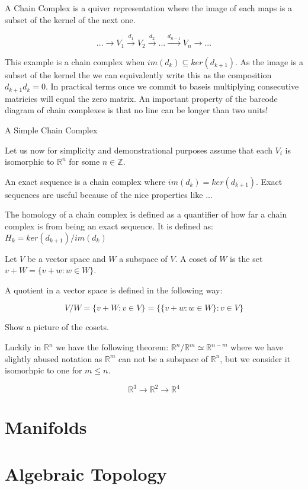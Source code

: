 A Chain Complex is a quiver representation where the image of each maps is a subset of the kernel of the next one.

$$ ... \longrightarrow V_1 \overset{d_1}{\longrightarrow} V_2 \overset{d_2}{\longrightarrow} ... \overset{d_{n-1}}{\longrightarrow} V_n  \longrightarrow ... $$

This example is a chain complex when $im(d_k) \subseteq ker(d_{k+1})$. As the image is a subset of the kernel the we can equivalently write this as the composition $d_{k+1}d_k = 0$. In practical terms once we commit to baseis multiplying consecutive matricies will equal the zero matrix. An important property of the barcode diagram of chain complexes is that no line can be longer than two units!


\begin{ex}  A Simple Chain Complex \end{ex}
Let us now for simplicity and demonstrational purposes assume that each $V_i$ is isomorphic to $\mathbb{R}^n$ for some $n \in \mathbb{Z}$.


An exact sequence is a chain complex where $im(d_k) = ker(d_{k+1})$. Exact sequences are useful because of the nice properties like ...

The homology of a chain complex is defined as a quantifier of how far a chain complex is from being an exact sequence. It is defined as: $ H_k = ker(d_{k+1}) / im(d_k) $

Let $V$ be a vector space and $W$ a subspace of $V$. A coset of $W$ is the set $v + W = \{v + w : w \in W\}$.

A quotient in a vector space is defined in the following way: 

$$ V/W = \{v + W: v \in V\} = \{\{v + w : w \in W\} : v \in V \}$$

Show a picture of the cosets.

Luckily in $\mathbb{R}^n$ we have the following theorem: $\mathbb{R}^n / \mathbb{R}^m \simeq \mathbb{R}^{n - m} $ where we have slightly abused notation as $\mathbb{R}^m$ can not be a subspace of $\mathbb{R}^n$, but we consider it isomorhpic to one for $m \le n$.

$$ \mathbb{R}^3 {\longrightarrow} \mathbb{R}^2 {\longrightarrow} \mathbb{R}^4 $$


\section{Manifolds}

\section{Algebraic Topology}


